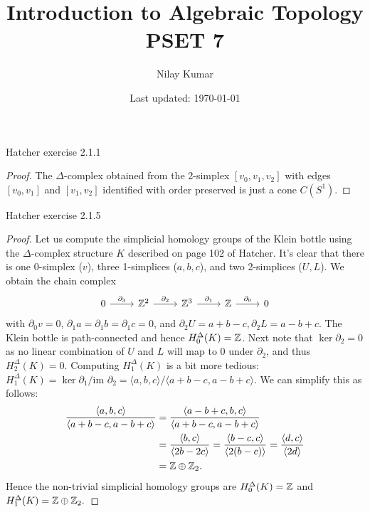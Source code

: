 \documentclass{../../mathnotes}
\title{Introduction to Algebraic Topology PSET 7}
\author{Nilay Kumar}
\date{Last updated: \today}
\begin{document}
\maketitle

\begin{prop}
    Hatcher exercise 2.1.1
\end{prop}
\begin{proof}
    The $\Delta$-complex obtained from the 2-simplex $[v_0,v_1,v_2]$ with edges
    $[v_0,v_1]$ and $[v_1,v_2]$ identified with order preserved is just a cone $C(S^1)$.
\end{proof}

\begin{prop}
    Hatcher exercise 2.1.5
\end{prop}
\begin{proof}
    Let us compute the simplicial homology groups of the Klein bottle using the $\Delta$-complex 
    structure $K$ described on page 102 of Hatcher. It's clear that there is one 0-simplex ($v$), three
    1-simplices ($a,b,c$), and two 2-simplices ($U,L$). We obtain the chain complex
    \begin{equation*}
        \begin{tikzcd}
            0\arrow{r}{\partial_3}&\Z^2\arrow{r}{\partial_2}&\Z^3\arrow{r}{\partial_1}&\Z\arrow{r}{\partial_0}&0
        \end{tikzcd}
    \end{equation*}
    with $\partial_0v=0$, $\partial_1a=\partial_1b=\partial_1c=0$, and $\partial_2U=a+b-c,\partial_2L=a-b+c$.
    The Klein bottle is path-connected and hence $H^\Delta_0(K)=\mathbb{Z}$. Next note that $\ker\partial_2=0$ as
    no linear combination of $U$ and $L$ will map to 0 under $\partial_2$, and thus $H^\Delta_2(K)=0$.
    Computing $H^\Delta_1(K)$ is a bit more tedious: $H_1^\Delta(K)=\ker \partial_1/\text{im }\partial_2
    =\langle a,b,c\rangle/\langle a+b-c,a-b+c\rangle$. We can simplify this as follows:
    \begin{align*}
        \frac{\langle a,b,c\rangle}{\langle a+b-c,a-b+c\rangle}&=\frac{\langle a-b+c,b,c\rangle}{\langle a+b-c,a-b+c\rangle}\\
        &=\frac{\langle b,c\rangle}{\langle 2b-2c\rangle}
        =\frac{\langle b-c,c\rangle}{\langle 2(b-c)\rangle}
        =\frac{\langle d,c\rangle}{\langle 2d\rangle}\\
        &=\mathbb{Z}\oplus\mathbb{Z}_2.
    \end{align*}
    Hence the non-trivial simplicial homology groups are $H^\Delta_0(K)=\mathbb{Z}$ and $H^\Delta_1(K)=\mathbb{Z}\oplus\mathbb{Z}_2.$
\end{proof}
\end{document}
